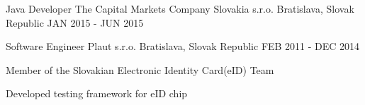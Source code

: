 \begin{cventries}
  \cventry
    {Java Developer} %
    {The Capital Markets Company Slovakia s.r.o.} %
    {Bratislava, Slovak Republic} %
    {JAN 2015 - JUN 2015} %
    {
    }

  \cventry
    {Software Engineer} %
    {Plaut s.r.o.} %
    {Bratislava, Slovak Republic} %
    {FEB 2011 - DEC 2014} %
    {
      \begin{cvitems} %
        \item {Member of the Slovakian Electronic Identity Card(eID) Team}
        \item {Developed testing framework for eID chip}
      \end{cvitems}
    }

\end{cventries}
